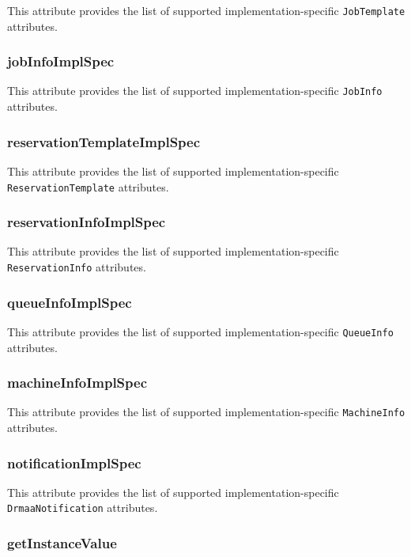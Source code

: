 \documentclass{article}
\newcommand{\h}[1]{\lstinline|#1|}
\begin{document}
This attribute provides the list of supported implementation-specific \h{JobTemplate} attributes. 

\subsubsection{jobInfoImplSpec}

This attribute provides the list of supported implementation-specific \h{JobInfo} attributes. 

\subsubsection{reservationTemplateImplSpec}

This attribute provides the list of supported implementation-specific \h{ReservationTemplate} attributes. 

\subsubsection{reservationInfoImplSpec}

This attribute provides the list of supported implementation-specific \h{ReservationInfo} attributes. 

\subsubsection{queueInfoImplSpec}

This attribute provides the list of supported implementation-specific \h{QueueInfo} attributes. 

\subsubsection{machineInfoImplSpec}

This attribute provides the list of supported implementation-specific \h{MachineInfo} attributes. 

\subsubsection{notificationImplSpec}

This attribute provides the list of supported implementation-specific \h{DrmaaNotification} attributes. 

\subsubsection{getInstanceValue}
\end{document}
